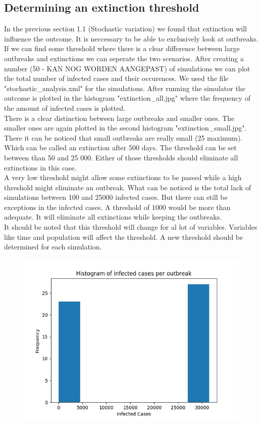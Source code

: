 \documentclass[runningheads]{llncs}
\begin{document}
\subsection{Determining an extinction threshold}
In the previous section 1.1 (Stochastic variation) we found that extinction will influence the outcome. It is neccessary to be able to exclusively look at outbreaks. If we can find some threshold where there is a clear difference between large outbreaks and extinctions we can seperate the two scenarios. After creating a number (50 - KAN NOG WORDEN AANGEPAST) of simulations we can plot the total number of infected cases and their occurences.  We used the file "stochastic\_analysis.xml" for the simulations. After running the simulator the outcome is plotted in the histogram "extinction\_all.jpg" where the frequency of the amount of infected cases is plotted.\\
There is a clear distinction between large outbreaks and smaller ones. The smaller ones are again plotted in the second histogram "extinction\_small.jpg". There it can be noticed that small outbreaks are really small (25 maximum). Which can be called an extinction after 500 days. The threshold can be set between than 50 and 25 000. Either of those thresholds should eliminate all extinctions in this case.\\
A very low threshold might allow some extinctions to be passed while a high threshold might eliminate an outbreak. What can be noticed is the total lack of simulations between 100 and 25000 infected cases. But there can still be exceptions in the infected cases. A threshold of 1000 would be more than adequate. It will eliminate all extinctions while keeping the outbreaks.\\
It should be noted that this threshold will change for al lot of variables. Variables like time and population will affect the threshold. A new threshold should be determined for each simulation.

\begin{figure}
	\includegraphics[width=\textwidth]{extinction_all.jpg}	
	\label{fig3}
\end{figure}
\end{document}
